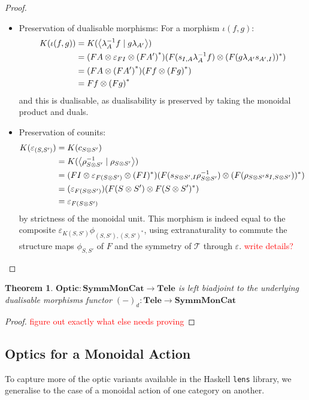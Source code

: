 \documentclass[11pt,letterpaper]{article}
\theoremstyle{plain}
\newtheorem{theorem}{Theorem}[subsection]
\theoremstyle{definition}
\newcommand{\T}{\mathscr{T}}
\newcommand{\lenslib}{\texttt{lens}}
\newcommand{\SymmMonCat}{\mathbf{SymmMonCat}}
\newcommand{\Tele}{\mathbf{Tele}}
\newcommand{\Optic}{\mathbf{Optic}}
\newcommand{\rep}[2]{{\ensuremath \left\langle #1 \mid #2 \right\rangle}}
\newcommand{\todo}[1]{\textcolor{red}{\small #1}}
\begin{document}
\begin{proof}
\begin{itemize}
\item Preservation of dualisable morphisms:  For a morphism $\iota(f, g)$:
\begin{align*}
K(\iota(f, g))
    &= K(\rep{\lambda_A^{-1} f}{g \lambda_{A'}}) \\
    &= (FA \otimes \varepsilon_{FI} \otimes {(FA')}^*)(F(s_{I,A}\lambda_A^{-1} f) \otimes (F(g \lambda_{A'}s_{A', I}))^* ) \\
    &= (FA \otimes {(FA')}^*)(Ff \otimes {(Fg)}^* ) \\
    &= Ff \otimes {(Fg)}^*
\end{align*}
and this is dualisable, as dualisability is preserved by taking the monoidal product and duals.
\item Preservation of counits:
\begin{align*}
K(\varepsilon_{(S, S')})
&= K(c_{S \otimes S'}) \\
&= K(\rep{\rho_{S \otimes S'}^{-1}}{\rho_{S \otimes S'}}) \\
&= (FI \otimes \varepsilon_{F(S \otimes S')} \otimes (FI)^*)(F(s_{S \otimes S',I}\rho_{S \otimes S'}^{-1}) \otimes (F(\rho_{S \otimes S'} s_{I, S \otimes S'}))^* ) \\
&= (\varepsilon_{F(S \otimes S')})(F(S \otimes S') \otimes F(S \otimes S')^* ) \\
&= \varepsilon_{F(S \otimes S')}
\end{align*}
by strictness of the monoidal unit. This morphism is indeed equal to the composite $\varepsilon_{K(S, S')} \phi_{(S, S'), {(S, S')}^*}$, using extranaturality to commute the structure maps $\phi_{S, S'}$ of $F$ and the symmetry of $\T$ through $\varepsilon$. \todo{write details?}
\end{itemize}
\end{proof}

\begin{theorem}
$\Optic : \SymmMonCat \to \Tele$ is left biadjoint to the underlying dualisable morphisms functor ${(-)}_d : \Tele \to \SymmMonCat$
\end{theorem}
\begin{proof}
\todo{figure out exactly what else needs proving}
\end{proof}

\subsection{Optics for a Monoidal Action}

To capture more of the optic variants available in the Haskell \lenslib{} library, we generalise to the case of a monoidal action of one category on another.
\end{document}
